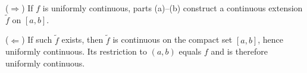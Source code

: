 \begin{enumerate}
\begin{solution}
($\Rightarrow$) If $f$ is uniformly continuous, parts (a)--(b) construct a continuous extension $\tilde f$ on $[a,b]$.

($\Leftarrow$) If such $\tilde f$ exists, then $\tilde f$ is continuous on the compact set $[a,b]$, hence uniformly
continuous. Its restriction to $(a,b)$ equals $f$ and is therefore uniformly continuous.
\end{solution}
\end{enumerate}

